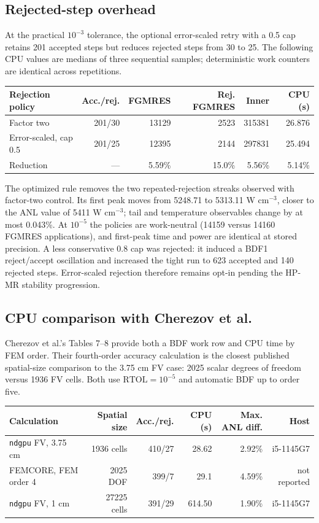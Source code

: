 \documentclass[10pt]{article}
\newcommand{\ndgpu}{\texttt{ndgpu}}
\begin{document}
\subsection{Rejected-step overhead}

At the practical $10^{-3}$ tolerance, the optional error-scaled retry with a
0.5 cap retains 201 accepted steps but reduces rejected steps from 30 to 25.
The following CPU values are medians of three sequential samples; deterministic
work counters are identical across repetitions.

\begin{center}
\small
\begin{tabular}{|l|r|r|r|r|r|}
\hline
Rejection policy & Acc./rej. & FGMRES & Rej. FGMRES & Inner & CPU (s) \\
\hline
Factor two & 201/30 & 13129 & 2523 & 315381 & 26.876 \\
Error-scaled, cap 0.5 & 201/25 & 12395 & 2144 & 297831 & 25.494 \\
\hline
Reduction & --- & 5.59\% & 15.0\% & 5.56\% & 5.14\% \\
\hline
\end{tabular}
\end{center}

The optimized rule removes the two repeated-rejection streaks observed with
factor-two control. Its first peak moves from 5248.71 to
5313.11 W cm$^{-3}$, closer to the ANL value of 5411 W cm$^{-3}$; tail and
temperature observables change by at most 0.043\%. At $10^{-5}$ the policies
are work-neutral (14159 versus 14160 FGMRES applications), and first-peak time
and power are identical at stored precision. A less conservative 0.8 cap was
rejected: it induced a BDF1 reject/accept oscillation and increased the tight
run to 623 accepted and 140 rejected steps. Error-scaled rejection therefore
remains opt-in pending the HP-MR stability progression.

\subsection{CPU comparison with Cherezov et al.}

Cherezov et al.'s Tables 7--8 provide both a BDF work row and CPU time by FEM
order. Their fourth-order accuracy calculation is the closest published
spatial-size comparison to the 3.75 cm FV case: 2025 scalar degrees of freedom
versus 1936 FV cells. Both use $\mathrm{RTOL}=10^{-5}$ and automatic BDF up to
order five.

\begin{center}
\small
\begin{tabular}{|l|r|r|r|r|r|}
\hline
Calculation & Spatial size & Acc./rej. & CPU (s) & Max. ANL diff. & Host \\
\hline
\ndgpu{} FV, 3.75 cm & 1936 cells & 410/27 & 28.62 & 2.92\% & i5-1145G7 \\
FEMCORE, FEM order 4 & 2025 DOF & 399/7 & 29.1 & 4.59\% & not reported \\
\ndgpu{} FV, 1 cm & 27225 cells & 391/29 & 614.50 & 1.90\% & i5-1145G7 \\
\hline
\end{tabular}
\end{center}
\end{document}
